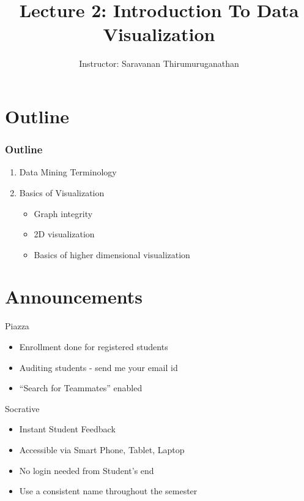 \documentclass{beamer}
\title[Saravanan Thirumuruganathan] 
{Lecture 2: Introduction To Data Visualization}
\author[CSE 5334] 
{Instructor: Saravanan Thirumuruganathan}
\date[]
\begin{document}
\begin{frame}
  \titlepage
\end{frame}


\section{Outline}

\begin{frame}
\frametitle {Outline}
\begin{enumerate}
\item Data Mining Terminology
\item Basics of Visualization
    \begin{itemize}
        \item Graph integrity
        \item 2D visualization
        \item Basics of higher dimensional visualization
    \end{itemize}
\end{enumerate}
\end{frame}


\section{Announcements}
\begin{frame}{Piazza}                                                                                              
    \begin{itemize}                                                                                                          
        \item Enrollment done for registered students
        \item Auditing students - send me your email id
        \item ``Search for Teammates'' enabled
    \end{itemize}                                                                                                            
\end{frame}   

\begin{frame}{Socrative}                                                                                              
    \begin{itemize}                                                                                                          
        \item Instant Student Feedback
        \item Accessible via Smart Phone, Tablet, Laptop
        \item No login needed from Student's end
        \item Use a consistent name throughout the semester
    \end{itemize}                                                                                                            
\end{frame}   
\end{document}
